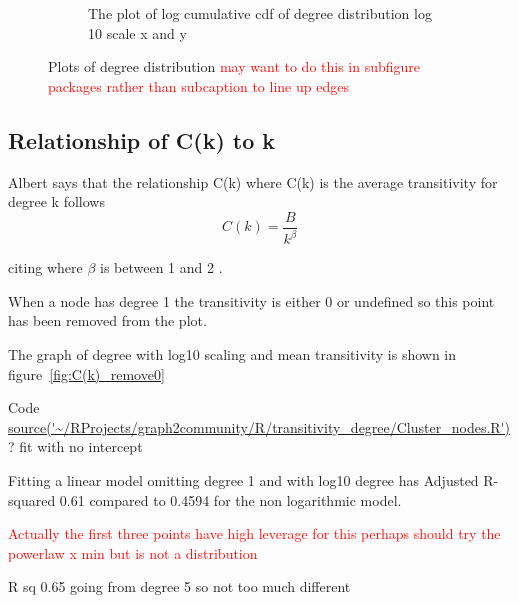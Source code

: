 \begin{figure}
\begin{subfigure}[t]{0.45\textwidth}
        \caption{The plot of log cumulative cdf of degree distribution log 10 scale x and y} \label{fig:log_degree_distribution}
    \end{subfigure}
    \caption{Plots of degree distribution \textcolor{red}{may want to do this in subfigure packages rather than subcaption to line up edges}}
    \label{fig:Plots of degree distribution}
\end{figure}



\subsection{Relationship of C(k) to k}
Albert \cite{albert2005scale} says that the relationship C(k) where C(k) is the average transitivity for degree k follows
\begin{equation}
            C(k) = \frac{B}{k^{\beta}}
\end{equation}
\label{eq:C(k) function average transitivity and degree}

citing \cite{yook2004functional} where $\beta$ is between 1 and 2 \cite{albert2005scale}.

When a node has degree 1 the transitivity is  either 0 or undefined so this point has been removed from the plot. 

The graph of degree with log10 scaling and mean transitivity is shown in figure~\ref{fig:C(k)_remove0}

Code \url{source('~/RProjects/graph2community/R/transitivity_degree/Cluster_nodes.R')}
? fit with no intercept

Fitting a linear model omitting degree 1 and with log10 degree has Adjusted R-squared 0.61 compared to 0.4594 for the non logarithmic model.

\textcolor{red}{Actually the first three points have high leverage for this perhaps should try the powerlaw x min but is not a distribution}

R sq 0.65 going from degree 5 so not too much different

